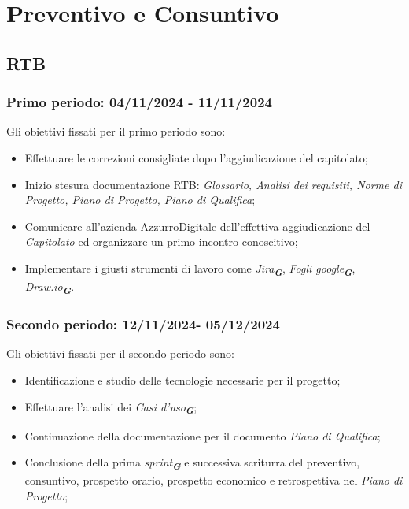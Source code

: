 \setcounter{secnumdepth}{5} %
\section{Preventivo e Consuntivo}
\label{sec:preventivo e consuntivo}

\subsection{RTB}
\subsubsection{Primo periodo: 04/11/2024 - 11/11/2024}
Gli obiettivi fissati per il primo periodo sono:
\begin{itemize}
    \item Effettuare le correzioni consigliate dopo l'aggiudicazione del capitolato;
    \item Inizio stesura documentazione RTB: \textit{Glossario, Analisi dei requisiti, Norme di Progetto, Piano di Progetto, Piano di Qualifica};
    \item Comunicare all'azienda AzzurroDigitale dell'effettiva aggiudicazione del \textit{Capitolato} ed organizzare un primo incontro conoscitivo;
    \item Implementare i giusti strumenti di lavoro come {\emph{Jira}}\textsubscript{\textit{\textbf{G}}}, {\emph{Fogli google}}\textsubscript{\textit{\textbf{G}}}, {\emph{Draw.io}}\textsubscript{\textit{\textbf{G}}}.
\end{itemize}

\subsubsection{Secondo periodo: 12/11/2024- 05/12/2024}
Gli obiettivi fissati per il secondo periodo sono:
\begin{itemize}
    \item Identificazione e studio delle tecnologie necessarie per il progetto;
    \item Effettuare l'analisi dei {\emph{Casi d'uso}}\textsubscript{\textit{\textbf{G}}};
    \item Continuazione della documentazione per il documento \textit{Piano di Qualifica};
    \item Conclusione della prima {\emph{sprint}}\textsubscript{\textit{\textbf{G}}} e successiva scriturra del preventivo, consuntivo, prospetto orario, prospetto economico e retrospettiva nel \textit{Piano di Progetto};
\end{itemize}

